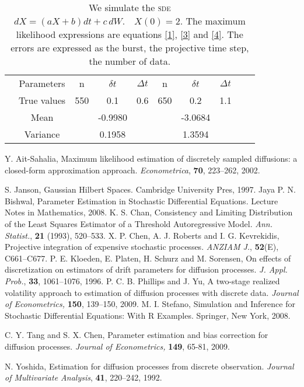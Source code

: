 \documentclass[12pt,reqno, a4paper]{article}
\numberwithin{equation}{section}
\begin{document}
\begin{table}[htbp]
  \caption{\label{tab1} We simulate the \textsc{sde}
$
dX=(aX+b)dt+c\,dW. \quad  X(0)=2.
$   The maximum likelihood expressions are equations \eqref{1}, \eqref{3}  and \eqref{4}. The errors are expressed as the burst, the projective time step, the number of data. }
 \begin{tabular}{cccccccccc}
  \toprule
  &Parameters  & n &  $\delta t$  & $\Delta t $& n  & $\delta t$&$\Delta t$\\
  &  True values  & 550 &0.1 & 0.6&650 &0.2&1.1 \\
  \midrule
&Mean& &  -0.9980& & &  -3.0684& \\
& Variance &  &0.1958 &  & & 1.3594&\\
  \bottomrule
 \end{tabular}

\end{table}
\begin{thebibliography}{99}
    Y. Ait-Sahalia,  Maximum likelihood estimation of discretely sampled diffusions: a closed-form approximation approach. \emph{Econometrica}, \textbf{70}, 223--262, 2002.


   S. Janson,  	
Gaussian Hilbert Spaces. Cambridge University Pres, 1997.
   Jaya P. N. Bishwal,  Parameter Estimation in Stochastic Differential Equations.
Lecture Notes in Mathematics, 2008.
 K. S. Chan,   Consistency and Limiting Distribution of the Least Squares Estimator of a Threshold Autoregressive Model. \emph{Ann. Statist.},  \textbf{21} (1993), 520--533.
   X.  P. Chen, A.  J. Roberts and I. G. Kevrekidis, Projective integration of expensive stochastic processes. \emph{ ANZIAM J.}, \textbf{ 52}(E), C661--C677.
    P. E. Kloeden,  E. Platen, H. Schurz and  M. Sorensen, On effects of discretization on estimators  of drift parameters for diffusion processes. \emph{J. Appl. Prob.},
\textbf{33}, 1061--1076, 1996.
   P.  C.  B.  Phillips  and  J. Yu,   A two-stage realized volatility approach to estimation of diffusion processes with discrete data. \emph{Journal of Econometrics,}
\textbf{150},   139--150,  2009.
  M. I.    Stefano,  Simulation and Inference for Stochastic Differential Equations: With R Examples.   Springer, New York, 2008.

    C. Y. Tang and S. X.
Chen, Parameter estimation and bias correction for diffusion processes.
\emph{Journal of Econometrics,}
\textbf{149},  65-81, 2009.

   N. Yoshida,
Estimation for diffusion processes from discrete observation.
\emph{Journal of Multivariate Analysis}, \textbf{41}, 220--242, 1992.




\end{thebibliography}
\end{document}
